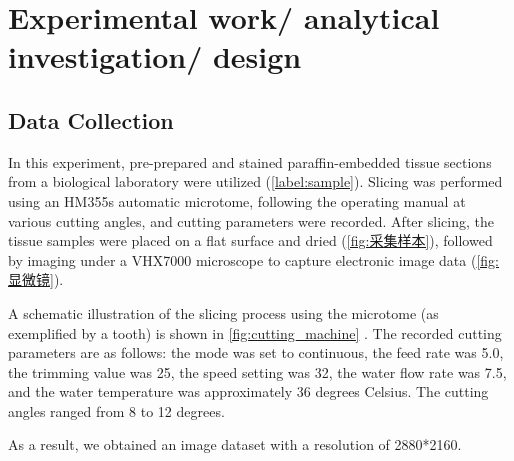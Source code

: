 \section{Experimental work/ analytical investigation/ design}

\subsection{Data Collection}
In this experiment, pre-prepared and stained paraffin-embedded tissue sections from a biological laboratory were utilized (\ref{label:sample}). Slicing was performed using an HM355s automatic microtome, following the operating manual at various cutting angles, and cutting parameters were recorded. After slicing, the tissue samples were placed on a flat surface and dried (\ref{fig:采集样本}), followed by imaging under a VHX7000 microscope to capture electronic image data (\ref{fig:显微镜}).

A schematic illustration of the slicing process using the microtome (as exemplified by a tooth) is shown in \autoref{fig:cutting_machine} \cite{4.1}. The recorded cutting parameters are as follows: the mode was set to continuous, the feed rate was 5.0, the trimming value was 25, the speed setting was 32, the water flow rate was 7.5, and the water temperature was approximately 36 degrees Celsius. The cutting angles ranged from 8 to 12 degrees.

As a result, we obtained an image dataset with a resolution of 2880*2160.

